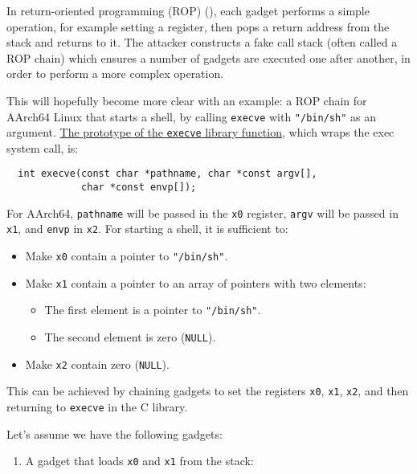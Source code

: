 \documentclass[
  a4paper,
]{report}
\providecommand{\tightlist}{%
  \setlength{\itemsep}{0pt}\setlength{\parskip}{0pt}}
\begin{document}
In \label{__index_entry_18}{return-oriented programming
(ROP)}
(), each gadget performs a
simple operation, for example setting a register, then pops a return
address from the stack and returns to it. The attacker constructs a fake
call stack (often called a \label{__index_entry_19}{ROP
chain}) which ensures a number of gadgets are executed
one after another, in order to perform a more complex operation.

This will hopefully become more clear with an example: a ROP chain for
AArch64 Linux that starts a shell, by calling \texttt{execve} with
\texttt{"/bin/sh"} as an argument.
\href{https://man7.org/linux/man-pages/man2/execve.2.html}{The prototype
of the \texttt{execve} library function}, which wraps the exec system
call, is:

\begin{verbatim}
  int execve(const char *pathname, char *const argv[],
             char *const envp[]);
\end{verbatim}

For AArch64, \texttt{pathname} will be passed in the \texttt{x0}
register, \texttt{argv} will be passed in \texttt{x1}, and \texttt{envp}
in \texttt{x2}. For starting a shell, it is sufficient to:

\begin{itemize}
\tightlist
\item
  Make \texttt{x0} contain a pointer to \texttt{"/bin/sh"}.
\item
  Make \texttt{x1} contain a pointer to an array of pointers with two
  elements:

  \begin{itemize}
  \tightlist
  \item
    The first element is a pointer to \texttt{"/bin/sh"}.
  \item
    The second element is zero (\texttt{NULL}).
  \end{itemize}
\item
  Make \texttt{x2} contain zero (\texttt{NULL}).
\end{itemize}

This can be achieved by chaining gadgets to set the registers
\texttt{x0}, \texttt{x1}, \texttt{x2}, and then returning to
\texttt{execve} in the C library.

Let's assume we have the following gadgets:

\begin{enumerate}
\def\labelenumi{\arabic{enumi}.}
\tightlist
\item
  A gadget that loads \texttt{x0} and \texttt{x1} from the stack:
\end{enumerate}
\end{document}
